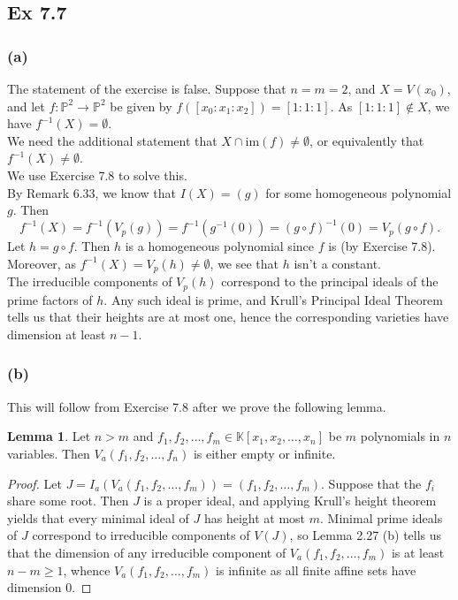 \documentclass{article}
\theoremstyle{definition}
\newtheorem{lemma}[theorem]{Lemma}
\newcommand{\K}{\mathbb{K}}
\renewcommand{\P}{\mathbb{P}}
\newcommand{\KP}[2]{\K[#1_1, #1_2, \ldots, #1_{#2}]}
\newcommand{\PP}[1]{\P^{#1}}
\newcommand{\im}{\text{im}}
\begin{document}
\subsection*{Ex 7.7}
\subsubsection*{(a)}

The statement of the exercise is false. Suppose that $n = m = 2$, and $X =
V(x_0)$, and let $f : \PP{2} \to \PP{2}$ be given by $f([x_0 : x_1 : x_2]) = [1
: 1 :1]$. As $[1 : 1 : 1] \not \in X$, we have $f^{-1}(X) = \emptyset$. \\

We need the additional statement that $X \cap \im(f) \not = \emptyset$,
or equivalently that $f^{-1}(X) \not = \emptyset$. \\

We use Exercise 7.8 to solve this. \\

By Remark 6.33, we know that $I(X) = (g)$ for some homogeneous polynomial $g$.
Then
\[
	f^{-1}(X) 
	=  
	f^{-1}(V_p(g)) 
	=  
	f^{-1}(g^{-1}(0)) 
	= 
	(g \circ f)^{-1}(0)
	=
	V_p(g \circ f). 
\]
Let $h = g \circ f$. Then $h$ is a homogeneous polynomial since $f$ is (by
Exercise 7.8). Moreover, as $f^{-1}(X) = V_p(h) \not = \emptyset$, we see that
$h$ isn't a constant. \\

The irreducible components of $V_p(h)$ correspond to the principal ideals of
the prime factors of $h$. Any such ideal is prime, and Krull's Principal Ideal
Theorem tells us that their heights are at most one, hence the corresponding
varieties have dimension at least $n - 1$. \\

\subsubsection*{(b)}

This will follow from Exercise 7.8 after we prove the following lemma.

\begin{lemma}
	Let $n > m$ and $f_1, f_2, \ldots, f_m \in \KP{x}{n}$ be $m$ polynomials in
	$n$ variables. Then $V_a(f_1, f_2, \ldots, f_n)$ is either empty or infinite.
\end{lemma}
\begin{proof}
	Let $J = I_a(V_a(f_1, f_2, \ldots, f_m)) = (f_1, f_2, \ldots, f_m)$.
	Suppose that the $f_i$ share some root. Then $J$ is a proper ideal, and
	applying Krull's height theorem yields that every minimal ideal of $J$ has
	height at most $m$. Minimal prime ideals of $J$ correspond to irreducible
	components of $V(J)$, so Lemma 2.27 (b) tells us that the dimension of any
	irreducible component of $V_a(f_1, f_2, \ldots, f_m)$ is at least $n - m
	\geq 1$, whence $V_a(f_1, f_2, \ldots, f_m)$ is infinite as all finite
	affine sets have dimension $0$.
\end{proof}
\end{document}
